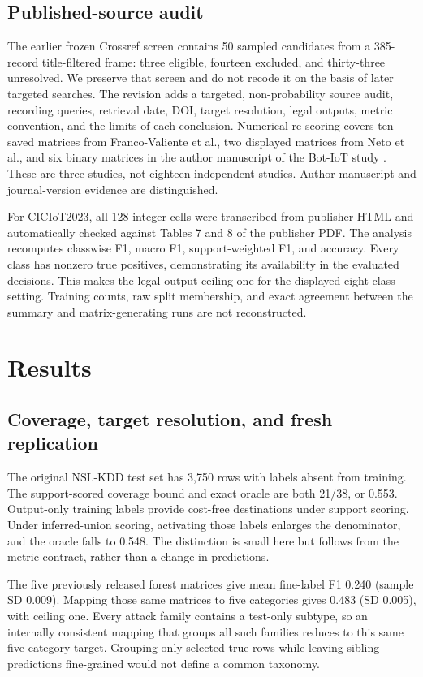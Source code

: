 \documentclass[twocolumn]{svjour3}
\begin{document}
\subsection{Published-source audit}
The earlier frozen Crossref screen contains 50 sampled candidates from a 385-record title-filtered frame: three eligible, fourteen excluded, and thirty-three unresolved. We preserve that screen and do not recode it on the basis of later targeted searches. The revision adds a targeted, non-probability source audit, recording queries, retrieval date, DOI, target resolution, legal outputs, metric convention, and the limits of each conclusion. Numerical re-scoring covers ten saved matrices from Franco-Valiente et al., two displayed matrices from Neto et al., and six binary matrices in the author manuscript of the Bot-IoT study \cite{francovaliente2026} \cite{neto2023} \cite{koroniotis2019}. These are three studies, not eighteen independent studies. Author-manuscript and journal-version evidence are distinguished.

For CICIoT2023, all 128 integer cells were transcribed from publisher HTML and automatically checked against Tables 7 and 8 of the publisher PDF. The analysis recomputes classwise F1, macro F1, support-weighted F1, and accuracy. Every class has nonzero true positives, demonstrating its availability in the evaluated decisions. This makes the legal-output ceiling one for the displayed eight-class setting. Training counts, raw split membership, and exact agreement between the summary and matrix-generating runs are not reconstructed.

\section{Results}
\subsection{Coverage, target resolution, and fresh replication}
The original NSL-KDD test set has 3,750 rows with labels absent from training. The support-scored coverage bound and exact oracle are both 21/38, or 0.553. Output-only training labels provide cost-free destinations under support scoring. Under inferred-union scoring, activating those labels enlarges the denominator, and the oracle falls to 0.548. The distinction is small here but follows from the metric contract, rather than a change in predictions.

The five previously released forest matrices give mean fine-label F1 0.240 (sample SD 0.009). Mapping those same matrices to five categories gives 0.483 (SD 0.005), with ceiling one. Every attack family contains a test-only subtype, so an internally consistent mapping that groups all such families reduces to this same five-category target. Grouping only selected true rows while leaving sibling predictions fine-grained would not define a common taxonomy.
\end{document}
